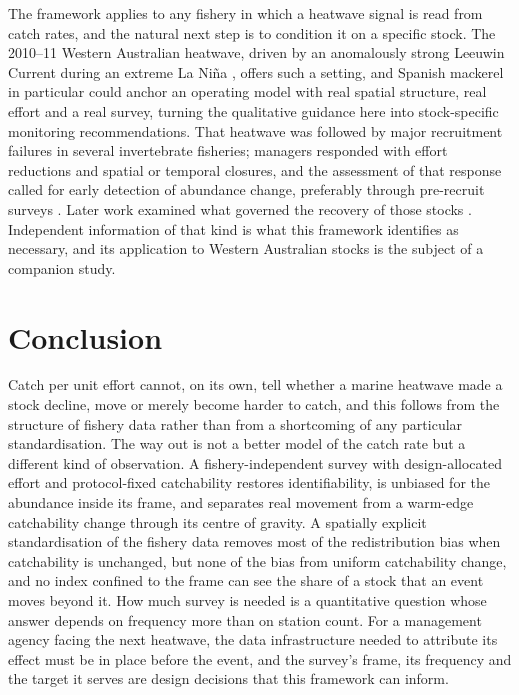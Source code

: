 \documentclass[11pt,a4paper]{article}
\begin{document}
The framework applies to any fishery in which a heatwave signal is read from catch rates, and the natural next step is to condition it on a specific stock. The 2010--11 Western Australian heatwave, driven by an anomalously strong Leeuwin Current during an extreme La Ni\~{n}a \citep{pearce2013,feng2013}, offers such a setting, and Spanish mackerel in particular could anchor an operating model with real spatial structure, real effort and a real survey, turning the qualitative guidance here into stock-specific monitoring recommendations. That heatwave was followed by major recruitment failures in several invertebrate fisheries; managers responded with effort reductions and spatial or temporal closures, and the assessment of that response called for early detection of abundance change, preferably through pre-recruit surveys \citep{caputi2016}. Later work examined what governed the recovery of those stocks \citep{caputi2019}. Independent information of that kind is what this framework identifies as necessary, and its application to Western Australian stocks is the subject of a companion study.

\section{Conclusion}

Catch per unit effort cannot, on its own, tell whether a marine heatwave made a stock decline, move or merely become harder to catch, and this follows from the structure of fishery data rather than from a shortcoming of any particular standardisation. The way out is not a better model of the catch rate but a different kind of observation. A fishery-independent survey with design-allocated effort and protocol-fixed catchability restores identifiability, is unbiased for the abundance inside its frame, and separates real movement from a warm-edge catchability change through its centre of gravity. A spatially explicit standardisation of the fishery data removes most of the redistribution bias when catchability is unchanged, but none of the bias from uniform catchability change, and no index confined to the frame can see the share of a stock that an event moves beyond it. How much survey is needed is a quantitative question whose answer depends on frequency more than on station count. For a management agency facing the next heatwave, the data infrastructure needed to attribute its effect must be in place before the event, and the survey's frame, its frequency and the target it serves are design decisions that this framework can inform.
\end{document}
